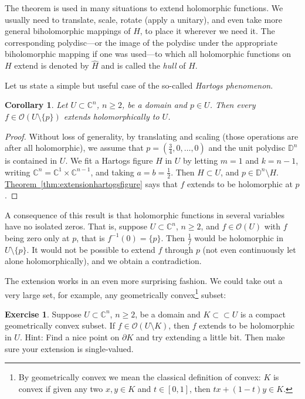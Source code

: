 \documentclass[12pt,openany]{book}
\newcommand{\C}{{\mathbb{C}}}
\newcommand{\D}{{\mathbb{D}}}
\newcommand{\sO}{{\mathscr{O}}}
\newcommand{\myindex}[1]{#1\index{#1}}
\theoremstyle{plain}
\newtheorem{cor}[thm]{Corollary}
\theoremstyle{remark}
\theoremstyle{definition}
\newenvironment{exbox}{%
    \def\FrameCommand{\vrule width 1pt \relax\hspace {10pt}}%
    \MakeFramed {\advance \hsize -\width \FrameRestore }%
}{%
    \endMakeFramed
}
\theoremstyle{exercise}
\newtheorem{exercise}{Exercise}[section]
\theoremstyle{example}
\newcommand{\thmref}[1]{\hyperref[#1]{Theorem~\ref*{#1}}}
\begin{document}
The theorem is used 
in many situations to extend holomorphic functions.
We usually need to
translate, scale, 
rotate (apply a unitary), and even take more general biholomorphic mappings
of $H$, to place it wherever we need it.  The corresponding polydisc---or the image of
the polydisc under the appropriate biholomorphic mapping if one was
used---to which all holomorphic functions on $H$ extend is denoted
by $\widehat{H}$ and is called the \emph{hull} of $H$.%

Let us state a simple but useful case of the so-called
\emph{\myindex{Hartogs phenomenon}}.

\begin{cor}
Let $U \subset \C^n$, $n \geq 2$, be a domain and $p \in U$.
Then every $f \in \sO(U \setminus \{ p \} )$
extends holomorphically to $U$.
\end{cor}

\begin{proof}
Without loss of generality,
by translating and scaling (those operations are after all holomorphic),
we assume that $p = (\frac{3}{4},0,\ldots,0)$
and the unit polydisc $\D^n$ is contained in $U$.  We fit a Hartogs figure $H$
in $U$
by letting $m=1$ and $k=n-1$, writing $\C^n = \C^{1} \times \C^{n-1}$,
and taking $a = b = \frac{1}{2}$.
Then $H \subset U$, and $p \in \D^n \setminus H$.
\thmref{thm:extensionhartogsfigure} says that
$f$ extends to be holomorphic at $p$.
\end{proof}

A consequence of this result is that holomorphic functions in several
variables have no isolated zeros.  That is, suppose $U \subset \C^n$,
$n \geq 2$, and $f \in \sO(U)$ with $f$ being zero only at $p$, that
is $f^{-1}(0) = \{ p \}$.  Then $\frac{1}{f}$ would be holomorphic in
$U \setminus \{ p \}$.  It would not be possible to extend $f$
through $p$ (not even continuously let alone holomorphically),
and we obtain a contradiction.

\pagebreak[2]
The extension works in an even more surprising fashion.  We could
take out a very large set, for example, any geometrically
convex\footnote{By geometrically convex we mean the classical
definition of convex: $K$ is convex if given any two $x,y \in K$ and $t \in [0,1]$,
then $t x + (1-t)y \in K$.} subset:

\begin{exbox}
\begin{exercise} \label{exercise:convexhartogs}
Suppose $U \subset \C^n$, $n \geq 2$, be a domain and $K \subset \subset U$
is a compact geometrically
convex subset.
If $f \in \sO(U \setminus K)$,
then $f$ extends to be holomorphic in $U$.
Hint: Find a nice point on $\partial K$ and try extending a little bit.
Then make sure your extension is single-valued.
\end{exercise}
\end{exbox}
\end{document}
